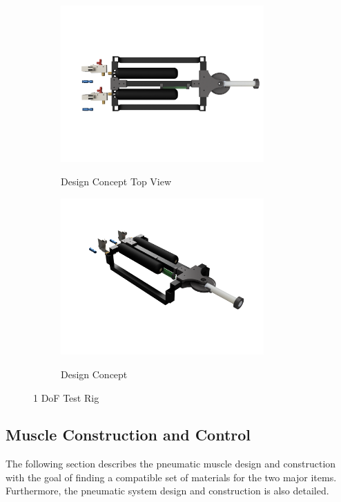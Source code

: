\documentclass[11pt,a4paper]{article}
\begin{document}
\begin{figure}[!hbt]
\begin{subfigure}[t]{0.95 \textwidth}
        \label{fig:test_rig_photo}
    \end{subfigure}\\
    \begin{subfigure}[t]{0.45 \textwidth}
        \centering
        \caption{Design Concept Top View}
        \includegraphics[height=6cm, trim={1cm 2cm 1cm 1cm},clip]{Testrig_top.PNG}
        \label{fig:test_rig_design_top}
    \end{subfigure}
    \begin{subfigure}[t]{0.45 \textwidth}
        \centering
        \caption{Design Concept}
        \includegraphics[height=6cm, trim={1cm 2cm 1cm 1cm},clip]{Testrig_home.PNG}
        \label{fig:test_rig_design}
    \end{subfigure}
    \caption{1 DoF Test Rig}
    \label{fig:test_rig}
\end{figure}


\subsection{Muscle Construction and Control}
\label{sub:muscle_construction}

The following section describes the pneumatic muscle design and construction with the goal of finding a compatible set of materials for the two major items. Furthermore, the pneumatic system design and construction is also detailed.
\end{document}
